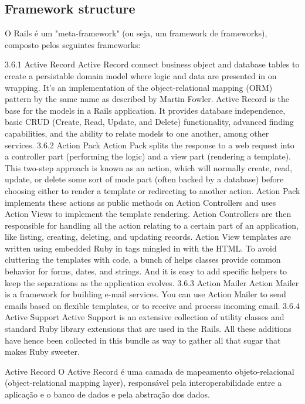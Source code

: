 \subsection{Framework structure} 

O Rails é um "meta-framework" (ou seja, um framework de frameworks), composto pelos seguintes frameworks:


3.6.1 Active Record
Active Record connect business object and database tables to create a persistable domain model where logic and data are presented in on wrapping. It’s an implementation of the object-relational mapping (ORM) pattern by the same name as described by Martin Fowler.
Active Record is the base for the models in a Rails application. It provides database independence, basic CRUD (Create, Read, Update, and Delete) functionality, advanced finding capabilities, and the ability to relate models to one another, among other services.
3.6.2 Action Pack
Action Pack splits the response to a web request into a controller part (performing the logic) and a view part (rendering a template). This two-step approach is known as an action, which will normally create, read, update, or delete some sort of mode part (often backed by a database) before choosing either to render a template or redirecting to another action.
Action Pack implements these actions as public methods on Action Controllers and uses Action Views to implement the template rendering. Action Controllers are then responsible for handling all the action relating to a certain part of an application, like listing, creating, deleting, and updating records.
Action View templates are written using embedded Ruby in tags mingled in with the HTML. To avoid cluttering the templates with code, a bunch of helps classes provide common behavior for forms, dates, and strings. And it is easy to add specific helpers to keep the separations as the application evolves.
3.6.3 Action Mailer
Action Mailer is a framework for building e-mail services. You can use Action Mailer to send emails based on flexible templates, or to receive and process incoming email.
3.6.4 Active Support
Active Support is an extensive collection of utility classes and standard Ruby library extensions that are used in the Rails. All these additions have hence been collected in this bundle as way to gather all that sugar that makes Ruby sweeter.

Active Record
O Active Record é uma camada de mapeamento objeto-relacional (object-relational mapping layer), responsável pela interoperabilidade entre a aplicação e o banco de dados e pela abstração dos dados.


